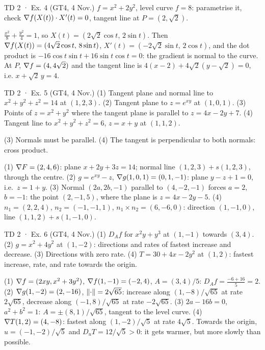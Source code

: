 \begin{problem}{TD 2 · Ex. 4 (GT4, 4 Nov.)}
$f=x^2+2y^2$, level curve $f=8$: parametrise it, check $\nabla f(X(t))\cdot X'(t)=0$, tangent
line at $P=(2,\sqrt2)$.
\end{problem}
\begin{solution}
$\frac{x^2}{8}+\frac{y^2}{4}=1$, so $X(t)=(2\sqrt2\cos t,\,2\sin t)$. Then
$\nabla f(X(t))=(4\sqrt2\cos t,\,8\sin t)$, $X'(t)=(-2\sqrt2\sin t,\,2\cos t)$, and the dot
product is $-16\cos t\sin t+16\sin t\cos t=0$: the gradient is normal to the curve. At $P$,
$\nabla f=(4,4\sqrt2)$ and the tangent line is $4(x-2)+4\sqrt2(y-\sqrt2)=0$, i.e.
$x+\sqrt2\,y=4$.
\end{solution}

\begin{problem}{TD 2 · Ex. 5 (GT4, 4 Nov.)}
(1) Tangent plane and normal line to $x^2+y^2+z^2=14$ at $(1,2,3)$. (2) Tangent plane to
$z=e^{xy}$ at $(1,0,1)$. (3) Points of $z=x^2+y^2$ where the tangent plane is parallel to
$z=4x-2y+7$. (4) Tangent line to $x^2+y^2+z^2=6$, $z=x+y$ at $(1,1,2)$.
\end{problem}
\begin{hint}(3) Normals must be parallel. (4) The tangent is perpendicular to both normals:
cross product.\end{hint}
\begin{solution}
(1) $\nabla F=(2,4,6)$: plane $x+2y+3z=14$; normal line $(1,2,3)+s(1,2,3)$, through the centre.
(2) $g=e^{xy}-z$, $\nabla g(1,0,1)=(0,1,-1)$: plane $y-z+1=0$, i.e.\ $z=1+y$.
(3) Normal $(2a,2b,-1)$ parallel to $(4,-2,-1)$ forces $a=2$, $b=-1$: the point $(2,-1,5)$, where
the plane is $z=4x-2y-5$.
(4) $n_1=(2,2,4)$, $n_2=(-1,-1,1)$, $n_1\times n_2=(6,-6,0)$: direction $(1,-1,0)$, line
$(1,1,2)+s(1,-1,0)$.
\end{solution}

\begin{problem}{TD 2 · Ex. 6 (GT4, 4 Nov.)}
(1) $D_Af$ for $x^2y+y^3$ at $(1,-1)$ towards $(3,4)$. (2) $g=x^2+4y^2$ at $(1,-2)$: directions
and rates of fastest increase and decrease. (3) Directions with zero rate. (4) $T=30+4x-2y^2$ at
$(1,2)$: fastest increase, rate, and rate towards the origin.
\end{problem}
\begin{solution}
(1) $\nabla f=(2xy,x^2+3y^2)$, $\nabla f(1,-1)=(-2,4)$, $A=(3,4)/5$: $D_Af=\frac{-6+16}{5}=2$.
(2) $\nabla g(1,-2)=(2,-16)$, $\left\lVert \cdot\right\rVert=2\sqrt{65}$: increase along $(1,-8)/\sqrt{65}$ at rate
$2\sqrt{65}$, decrease along $(-1,8)/\sqrt{65}$ at rate $-2\sqrt{65}$.
(3) $2a-16b=0$, $a^2+b^2=1$: $A=\pm(8,1)/\sqrt{65}$, tangent to the level curve.
(4) $\nabla T(1,2)=(4,-8)$: fastest along $(1,-2)/\sqrt5$ at rate $4\sqrt5$. Towards the origin,
$u=(-1,-2)/\sqrt5$ and $D_uT=12/\sqrt5>0$: it gets warmer, but more slowly than possible.
\end{solution}


